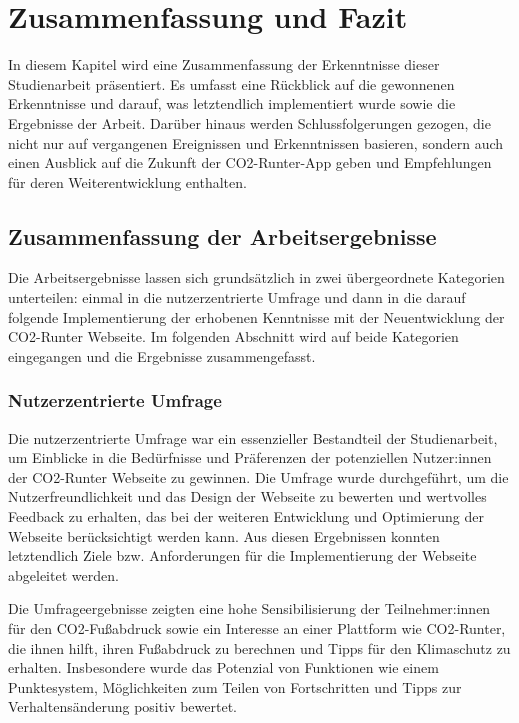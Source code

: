 
\chapter{Zusammenfassung und Fazit }
\label{chapter:7}

In diesem Kapitel wird eine Zusammenfassung der Erkenntnisse dieser Studienarbeit präsentiert. Es umfasst eine Rückblick auf die gewonnenen Erkenntnisse und darauf, was letztendlich implementiert wurde sowie die Ergebnisse der Arbeit. Darüber hinaus werden Schlussfolgerungen gezogen, die nicht nur auf vergangenen Ereignissen und Erkenntnissen basieren, sondern auch einen Ausblick auf die Zukunft der CO2-Runter-App geben und Empfehlungen für deren Weiterentwicklung enthalten.

\section{Zusammenfassung der Arbeitsergebnisse}

Die Arbeitsergebnisse lassen sich grundsätzlich in zwei übergeordnete Kategorien unterteilen: einmal in die nutzerzentrierte Umfrage und dann in die darauf folgende Implementierung der erhobenen Kenntnisse mit der Neuentwicklung der CO2-Runter Webseite. Im folgenden Abschnitt wird auf beide Kategorien eingegangen und die Ergebnisse zusammengefasst.

\subsection{Nutzerzentrierte Umfrage}

Die nutzerzentrierte Umfrage war ein essenzieller Bestandteil der Studienarbeit, um Einblicke in die Bedürfnisse und Präferenzen der potenziellen Nutzer:innen der CO2-Runter Webseite zu gewinnen. Die Umfrage wurde durchgeführt, um die Nutzerfreundlichkeit und das Design der Webseite zu bewerten und wertvolles Feedback zu erhalten, das bei der weiteren Entwicklung und Optimierung der Webseite berücksichtigt werden kann. Aus diesen Ergebnissen konnten letztendlich Ziele bzw. Anforderungen für die Implementierung der Webseite abgeleitet werden.

Die Umfrageergebnisse zeigten eine hohe Sensibilisierung der Teilnehmer:innen für den CO2-Fußabdruck sowie ein Interesse an einer Plattform wie CO2-Runter, die ihnen hilft, ihren Fußabdruck zu berechnen und Tipps für den Klimaschutz zu erhalten. Insbesondere wurde das Potenzial von Funktionen wie einem Punktesystem, Möglichkeiten zum Teilen von Fortschritten und Tipps zur Verhaltensänderung positiv bewertet.

